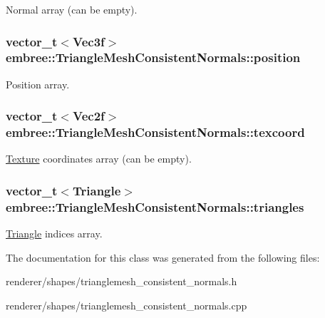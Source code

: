 Normal array (can be empty). 

\hypertarget{classembree_1_1_triangle_mesh_consistent_normals_ac123e3f2933e7ba9983a46e35da96e3c}{
\subsubsection[{position}]{\setlength{\rightskip}{0pt plus 5cm}vector\_\-t$<$Vec3f$>$ {\bf embree::TriangleMeshConsistentNormals::position}}}
\label{classembree_1_1_triangle_mesh_consistent_normals_ac123e3f2933e7ba9983a46e35da96e3c}


Position array. 

\hypertarget{classembree_1_1_triangle_mesh_consistent_normals_aea3e6097dde4ed0fbd5e4050dc61d5c1}{
\subsubsection[{texcoord}]{\setlength{\rightskip}{0pt plus 5cm}vector\_\-t$<$Vec2f$>$ {\bf embree::TriangleMeshConsistentNormals::texcoord}}}
\label{classembree_1_1_triangle_mesh_consistent_normals_aea3e6097dde4ed0fbd5e4050dc61d5c1}


\hyperlink{classembree_1_1_texture}{Texture} coordinates array (can be empty). 

\hypertarget{classembree_1_1_triangle_mesh_consistent_normals_aa707ca2ad499a3073debfc02ef1bf6c6}{
\subsubsection[{triangles}]{\setlength{\rightskip}{0pt plus 5cm}vector\_\-t$<${\bf Triangle}$>$ {\bf embree::TriangleMeshConsistentNormals::triangles}}}
\label{classembree_1_1_triangle_mesh_consistent_normals_aa707ca2ad499a3073debfc02ef1bf6c6}


\hyperlink{structembree_1_1_triangle_mesh_consistent_normals_1_1_triangle}{Triangle} indices array. 



The documentation for this class was generated from the following files:\begin{DoxyCompactItemize}
\item 
renderer/shapes/trianglemesh\_\-consistent\_\-normals.h\item 
renderer/shapes/trianglemesh\_\-consistent\_\-normals.cpp\end{DoxyCompactItemize}
